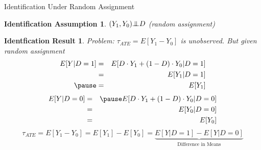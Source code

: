 \documentclass{beamer}
\numberwithin{equation}{section}
\newtheorem{iass}{Identification Assumption}
\newtheorem{ires}{Identfication Result}
\newcommand{\indep}{{\bot\negthickspace\negthickspace\bot}}
\begin{document}
\begin{frame}{Identification Under Random Assignment}

\begin{iass}\footnotesize
$(Y_1,Y_0) \indep D$ (random assignment)
\end{iass}

\pause

\begin{ires}\small
Problem: $\tau_{ATE}=E[Y_1-Y_0]$ is unobserved. But given random assignment
\begin{eqnarray*}
E[Y|D = 1] &=& E[D \cdot Y_1 + (1-D)\cdot Y_0|D=1]\\
&=& E[Y_1 |D=1]\\ \pause
&=& E[Y_1]
\end{eqnarray*}
\begin{eqnarray*}
E[Y|D = 0] &=& \pause E[D \cdot Y_1 + (1-D)\cdot Y_0|D=0]\\
&=& E[Y_0 |D=0]\\
&=& E[Y_0]
\end{eqnarray*}
\[
\tau_{ATE}=E[Y_1-Y_0]=E[Y_1] - E[Y_0]=\underbrace{E[Y|D=1]-E[Y|D=0]}_{\mbox{Difference in Means}}
\]
\end{ires}

\end{frame}
\end{document}
